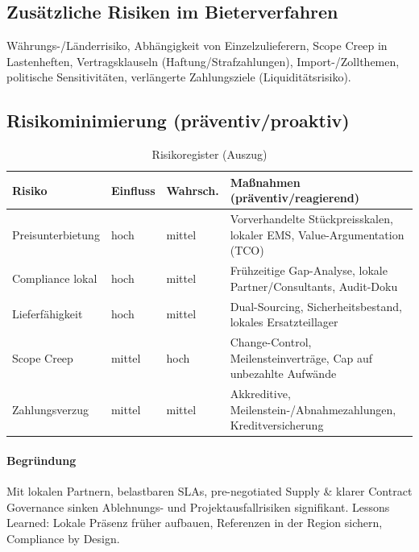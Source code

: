 \documentclass[
%
ngerman %
%
numeric %
]{wbh-assignment}
\begin{document}
\subsection{Zusätzliche Risiken im Bieterverfahren}
Währungs-/Länderrisiko, Abhängigkeit von Einzelzulieferern, Scope Creep in Lastenheften, Vertragsklauseln (Haftung/Strafzahlungen), Import-/Zollthemen, politische Sensitivitäten, verlängerte Zahlungsziele (Liquiditätsrisiko).

\subsection{Risikominimierung (präventiv/proaktiv)}
\begin{table}[htb!]
\centering
\caption{Risikoregister (Auszug)}
\begin{tabular}{l l l l}
\textbf{Risiko} & \textbf{Einfluss} & \textbf{Wahrsch.} & \textbf{Maßnahmen (präventiv/reagierend)} \\
\hline
Preisunterbietung & hoch & mittel & Vorverhandelte Stückpreisskalen, lokaler EMS, Value-Argumentation (TCO) \\
Compliance lokal & hoch & mittel & Frühzeitige Gap-Analyse, lokale Partner/Consultants, Audit-Doku \\
Lieferfähigkeit & hoch & mittel & Dual-Sourcing, Sicherheitsbestand, lokales Ersatzteillager \\
Scope Creep & mittel & hoch & Change-Control, Meilensteinverträge, Cap auf unbezahlte Aufwände \\
Zahlungsverzug & mittel & mittel & Akkreditive, Meilenstein-/Abnahmezahlungen, Kreditversicherung \\
\end{tabular}
\end{table}

\paragraph{Begründung}
Mit lokalen Partnern, belastbaren SLAs, pre-negotiated Supply \& klarer Contract Governance sinken Ablehnungs- und Projektausfallrisiken signifikant. Lessons Learned: Lokale Präsenz früher aufbauen, Referenzen in der Region sichern, Compliance by Design.

\clearpage


\end{document}
